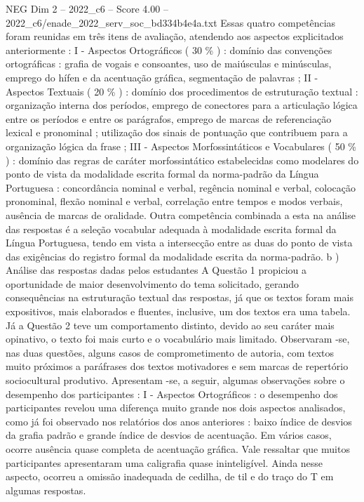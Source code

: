\begin{textsample}{NEG Dim 2 – 2022\_c6 – Score 4.00 – 2022\_c6/enade\_2022\_serv\_soc\_bd334b4e4a.txt}
Essas quatro competências foram reunidas em três itens de avaliação, atendendo aos aspectos explicitados anteriormente : I - Aspectos Ortográficos ( 30 \% ) : domínio das convenções ortográficas : grafia de vogais e consoantes, uso de maiúsculas e minúsculas, emprego do hífen e da acentuação gráfica, segmentação de palavras ; II - Aspectos Textuais ( 20 \% ) : domínio dos procedimentos de estruturação textual : organização interna dos períodos, emprego de conectores para a articulação lógica entre os períodos e entre os parágrafos, emprego de marcas de referenciação lexical e pronominal ; utilização dos sinais de pontuação que contribuem para a organização lógica da frase ; III - Aspectos Morfossintáticos e Vocabulares ( 50 \% ) : domínio das regras de caráter morfossintático estabelecidas como modelares do ponto de vista da modalidade escrita formal da norma-padrão da Língua Portuguesa : concordância nominal e verbal, regência nominal e verbal, colocação pronominal, flexão nominal e verbal, correlação entre tempos e modos verbais, ausência de marcas de oralidade.
Outra competência combinada a esta na análise das respostas é a seleção vocabular adequada à modalidade escrita formal da Língua Portuguesa, tendo em vista a intersecção entre as duas do ponto de vista das exigências do registro formal da modalidade escrita da norma-padrão. b ) Análise das respostas dadas pelos estudantes A Questão 1 propiciou a oportunidade de maior desenvolvimento do tema solicitado, gerando consequências na estruturação textual das respostas, já que os textos foram mais expositivos, mais elaborados e fluentes, inclusive, um dos textos era uma tabela.
Já a Questão 2 teve um comportamento distinto, devido ao seu caráter mais opinativo, o texto foi mais curto e o vocabulário mais limitado.
Observaram -se, nas duas questões, alguns casos de comprometimento de autoria, com textos muito próximos a paráfrases dos textos motivadores e sem marcas de repertório sociocultural produtivo.
Apresentam -se, a seguir, algumas observações sobre o desempenho dos participantes : I - Aspectos Ortográficos : o desempenho dos participantes revelou uma diferença muito grande nos dois aspectos analisados, como já foi observado nos relatórios dos anos anteriores : baixo índice de desvios da grafia padrão e grande índice de desvios de acentuação.
Em vários casos, ocorre ausência quase completa de acentuação gráfica.
Vale ressaltar que muitos participantes apresentaram uma caligrafia quase ininteligível.
Ainda nesse aspecto, ocorreu a omissão inadequada de cedilha, de til e do traço do T em algumas respostas.

\end{textsample}
